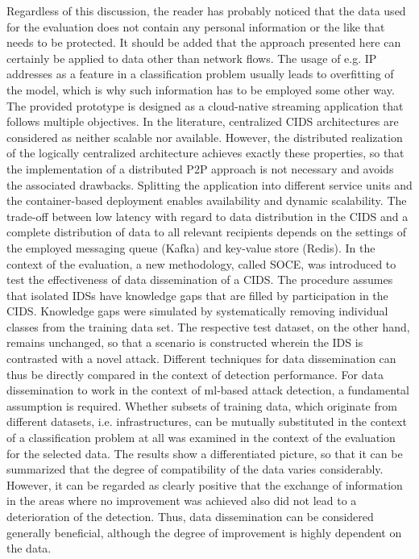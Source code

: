 \documentclass[../../main.tex]{subfiles}
\begin{document}
Regardless of this discussion, the reader has probably noticed that the data used for the evaluation does not contain any personal information or the like that needs to be protected. It should be added that the approach presented here can certainly be applied to data other than network flows. The usage of e.g. IP addresses as a feature in a classification problem usually leads to overfitting of the model, which is why such information has to be employed some other way. The provided prototype is designed as a cloud-native streaming application that follows multiple objectives. In the literature, centralized CIDS architectures are considered as neither scalable nor available. However, the distributed realization of the logically centralized architecture achieves exactly these properties, so that the implementation of a distributed P2P approach is not necessary and avoids the associated drawbacks. Splitting the application into different service units and the container-based deployment enables availability and dynamic scalability. The trade-off between low latency with regard to data distribution in the CIDS and a complete distribution of data to all relevant recipients depends on the settings of the employed messaging queue (Kafka) and key-value store (Redis). In the context of the evaluation, a new methodology, called SOCE, was introduced to test the effectiveness of data dissemination of a CIDS. The procedure assumes that isolated IDSs have knowledge gaps that are filled by participation in the CIDS. Knowledge gaps were simulated by systematically removing individual classes from the training data set. The respective test dataset, on the other hand, remains unchanged, so that a scenario is constructed wherein the IDS is contrasted with a novel attack. Different techniques for data dissemination can thus be directly compared in the context of detection performance. For data dissemination to work in the context of ml-based attack detection, a fundamental assumption is required. Whether subsets of training data, which originate from different datasets, i.e. infrastructures, can be mutually substituted in the context of a classification problem at all was examined in the context of the evaluation for the selected data. The results show a differentiated picture, so that it can be summarized that the degree of compatibility of the data varies considerably. However, it can be regarded as clearly positive that the exchange of information in the areas where no improvement was achieved also did not lead to a deterioration of the detection. Thus, data dissemination can be considered generally beneficial, although the degree of improvement is highly dependent on the data.  
\end{document}
